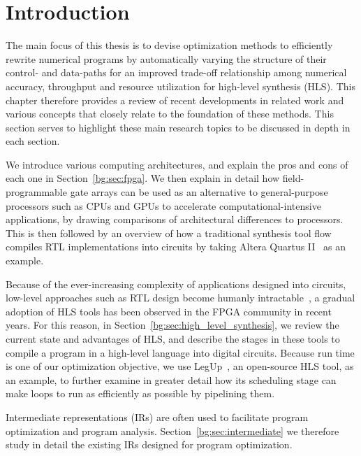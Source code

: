 \section{Introduction}
\label{bg:sec:introduction}

The main focus of this thesis is to devise optimization methods to efficiently
rewrite numerical programs by automatically varying the structure of their
control- and data-paths for an improved trade-off relationship among numerical
accuracy, throughput and resource utilization for high-level synthesis (HLS).
This chapter therefore provides a review of recent developments in related work
and various concepts that closely relate to the foundation of these methods.
This section serves to highlight these main research topics to be discussed in
depth in each section.

We introduce various computing architectures, and explain the pros and cons
of each one in Section~\ref{bg:sec:fpga}.  We then explain in detail how
field-programmable gate arrays can be used as an alternative to general-purpose
processors such as CPUs and GPUs to accelerate computational-intensive
applications, by drawing comparisons of architectural differences to
processors.  This is then followed by an overview of how a traditional
synthesis tool flow compiles RTL implementations into circuits by taking Altera
Quartus II~\cite{quartus} as an example.

Because of the ever-increasing complexity of applications designed
into circuits, low-level approaches such as RTL design become humanly
intractable~\cite{gajski}, a gradual adoption of HLS tools has been
observed in the FPGA community in recent years.  For this reason, in
Section~\ref{bg:sec:high_level_synthesis}, we review the current state and
advantages of HLS, and describe the stages in these tools to compile a program
in a high-level language into digital circuits.  Because run time is one of our
optimization objective, we use LegUp~\cite{legup}, an open-source HLS tool, as
an example, to further examine in greater detail how its scheduling stage can
make loops to run as efficiently as possible by pipelining them.

Intermediate representations (IRs) are often used to facilitate program
optimization and program analysis.  Section~\ref{bg:sec:intermediate} we
therefore study in detail the existing IRs designed for program optimization.

